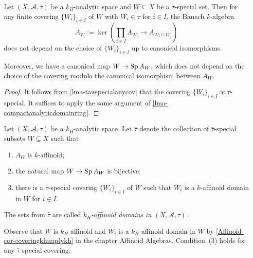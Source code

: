 \begin{lemma}\label{lma-AWspecial}
    Let  $(X,\mathcal{A},\tau)$ be a $k_H$-analytic space and $W\subseteq X$ be a $\tau$-special set. Then for any finite covering $\{W_i\}_{i\in I}$ of $W$ with $W_i\in \tau$ for $i\in I$, the Banach $k$-algebra
    \[
        A_W:=\ker\left(\prod_{i\in I}A_{W_i}\rightarrow A_{W_i\cap W_j}  \right)
    \]
    does not depend on the choice of $\{W_i\}_{i\in I}$ up to canonical isomorphisms.

    Moreover, we have a canonical map $W\rightarrow \operatorname{Sp} A_W$, which does not depend on the choice of the covering modulo the canonical isomorphism between $A_W$.
\end{lemma}
\begin{proof}
    It follows from \cref{lma-tauspecialanycov} that the covering $\{W_i\}_{i\in I}$ is $\tau$-special. It suffices to apply the same argument of \cref{lma-compactanalyticdomainring}.
\end{proof}

\begin{definition}
    Let  $(X,\mathcal{A},\tau)$ be a $k_H$-analytic space. Let $\hat{\tau}$ denote the collection of $\bar{\tau}$-special subsets $W\subseteq X$ such that 
    \begin{enumerate}
        \item $A_W$ is $k$-affinoid;
        \item the natural map $W\rightarrow \operatorname{Sp} A_W$ is bijective;
        \item there is a $\bar{\tau}$-special covering $\{W_i\}_{i\in I}$ of $W$ such that $W_i$ is a $k$-affinoid domain in $W$ for $i\in I$.
    \end{enumerate}

    The sets from $\hat{\tau}$ are called \emph{$k_H$-affinoid domains in $(X,\mathcal{A},\tau)$}.
\end{definition}
Observe that $W$ is $k_H$-affinoid and $W_i$ is a $k_H$-affinoid domain in $W$ by \cref{Affinoid-cor-coveringkhimplykh} in the chapter Affinoid Algebras. Condition~(3) holds for any $\bar{\tau}$-special covering.

